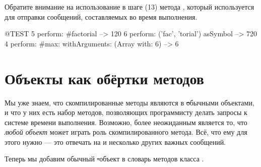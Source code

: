 \documentclass[a4paper,10pt,twoside]{book}
\begin{document}
Обратите внимание на использование в шаге (13) метода , который используется для отправки сообщений, составляемых во время выполнения.
\begin{code}{@TEST}
5 perform: #factorial                                             --> 120
6 perform: ('fac', 'torial') asSymbol                       --> 720
4 perform: #max: withArguments: (Array with: 6) --> 6
\end{code}

\section{Объекты как обёртки методов}

Мы уже знаем, что скомпилированные методы являются в \st обычными объектами, и что у них есть набор методов, позволяющих программисту делать запросы к системе времени выполнения.
Возможно, более неожиданным является то, что \emph{любой объект} может играть роль скомпилированного метода. Всё, что ему для этого нужно --- это отвечать на  и несколько других важных сообщений.


Теперь мы добавим обычный \st-объект в словарь методов класса .

\dothis{Выполните \lct{Demo methodDict at: \#answer42 put: ObjectsAsMethodsExample new.}
Теперь попробуйте напечатать результат выражения \ct{Demo new answer42}. На этот раз ответ будет \ct{42}.}
\end{document}
